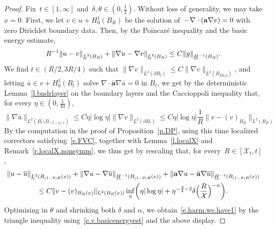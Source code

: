 \documentclass[11pt]{article} %
\numberwithin{equation}{section}
\theoremstyle{definition}
\let\originalleft\left
\let\originalright\right
\renewcommand{\left}{\mathopen{}\mathclose\bgroup\originalleft}
\renewcommand{\right}{\aftergroup\egroup\originalright}
\renewcommand{\a}{\mathbf{a}}
\newcommand{\ahom}{\bar{\a}}
\newcommand{\X}{\mathcal{X}}
\begin{document}
\begin{proof}
Fix~$t \in [1,\infty]$ and~$\delta,\theta \in (0,\frac12)$.
Without loss of generality, we may take $x=0$. 
First, we let $v \in u + H_0^1(B_R)$ be the solution of~$-\nabla \cdot \left( \a\nabla v \right) = 0$ with zero Dirichlet boundary data. Then, by the Poincar\'e inequality and the basic energy estimate, 
\begin{align}  \label{e.v.basicenergyest}
R^{-1} \left\| u - v \right\|_{\underline{L}^{2} \left( B_{R} \right)} 
+
  \left\| \nabla u - \nabla v \right\|_{\underline{L}^{2} \left( B_{R} \right)}
\leq 
C  \left\| g \right\|_{\underline{H}^{-1}(B_R)}
.
\end{align}
We find $t \in (R/2,3R/4)$ such that $\| \nabla v \|_{\underline{L}^2(\partial B_{t})} \leq C \| \nabla v \|_{\underline{L}^2(B_{3R/4})}$, and letting $\bar u \in v + H_0^1(B_t)$ solve $\nabla \cdot \ahom \nabla \bar u = 0$ in $B_t$, we get by the deterministic Lemma~\ref{l.bndrlayer} on the boundary layers and the Caccioppoli inequality that, for every $\eta \in (0,\frac1{10})$, 
\begin{equation*}
\| \nabla \bar u \|_{L^2(B_{t} \setminus B_{(1-\eta) t})} 
\leq 
C \eta | \log \eta| \| \nabla v \|_{\underline{L}^2(\partial B_{t})} 
\leq
C \eta | \log \eta| \frac1R \| v - (v)_{B_R} \|_{L^2(B_{R})}
\end{equation*}
By the computation in the proof of Proposition~\ref{p.DP}, using this time localized correctors satisfying~\eqref{e.FVC}, together with Lemma~\ref{l.localX} and Remark~\ref{r.localX.nonsymm}, we thus get by rescaling that, for every~$R \in[ \X_t,t]$, 
\begin{multline*}  
\left\| u - \overline{u}  \right\|_{\underline{L}^2(B_{(1-\theta)R}(x))} 
+
\left\| \nabla u - \nabla \overline{u}  \right\|_{\underline{H}^{-1}(B_{(1-\theta)R}(x))} 
+
\left\| \a \nabla u - \ahom \nabla \overline{u}  \right\|_{\underline{H}^{-1}(B_{(1-\theta)R}(x))} 
\\ 
\leq  C \| v - (v)_{B_R(x)} \|_{L^2(B_{R}(x))} \inf_{\eta}\left(  \eta | \log \eta|  + \eta^{-\frac d2 -2}   \delta \Bigl( \frac{R}{\X} \Bigr)^{-\alpha}  \right) .
\end{multline*}
Optimizing in $\theta$ and shrinking both $\delta$ and $\alpha$, we obtain~\eqref{e.harm.we.have1} by the triangle inequality using~\eqref{e.v.basicenergyest} and the above display. 
\end{proof}
\end{document}
